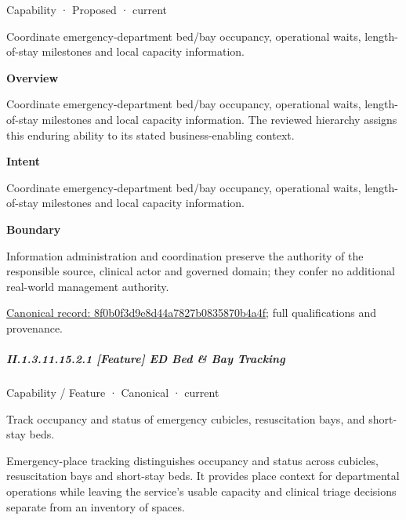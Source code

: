 \label{element:8f0b0f3d9e8d44a7827b0835870b4a4f}
{\small Capability · Proposed · current}\par

Coordinate emergency-department bed/bay occupancy, operational waits, length-of-stay milestones and local capacity information.



\textbf{Overview}



Coordinate emergency-department bed/bay occupancy, operational waits, length-of-stay milestones and local capacity information. The reviewed hierarchy assigns this enduring ability to its stated business-enabling context.



\textbf{Intent}



Coordinate emergency-department bed/bay occupancy, operational waits, length-of-stay milestones and local capacity information.



\textbf{Boundary}



Information administration and coordination preserve the authority of the responsible source, clinical actor and governed domain; they confer no additional real-world management authority.


{\footnotesize \href{../../../../continuum/strategy/capability/8f0b0f3d9e8d44a7827b0835870b4a4f.md}{Canonical record: 8f0b0f3d9e8d44a7827b0835870b4a4f}; full qualifications and provenance.}\par
\subparagraph*{II.1.3.11.15.2.1 [Feature] ED Bed \& Bay Tracking}
\label{navigation:II.1.3.11.15.2.1}

\label{element:7c0251128fc942d88bf25141421fd909}
{\small Capability / Feature · Canonical · current}\par

Track occupancy and status of emergency cubicles, resuscitation bays, and short-stay beds.



Emergency-place tracking distinguishes occupancy and status across cubicles, resuscitation bays and short-stay beds. It provides place context for departmental operations while leaving the service's usable capacity and clinical triage decisions separate from an inventory of spaces.



